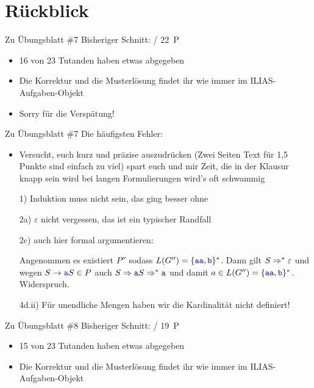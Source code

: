 
\newcommand{\handout}{}



\morescalingdelimiters



\section{Rückblick}

\begin{frame}{Zu Übungsblatt \#7}
	Bisheriger Schnitt:  / 22~P

	\begin{itemize}[<+->]
		\item 16 von 23 Tutanden haben etwas abgegeben
		\item Die Korrektur und die Musterlösung findet ihr wie immer im ILIAS-Aufgaben-Objekt
		\item Sorry für die Verspätung!
	\end{itemize}
\end{frame}

\begin{frame}{Zu Übungsblatt \#7}
	Die häufigsten Fehler:
	\begin{itemize}[<+->]
		\item Versucht, euch kurz und präzise auszudrücken \small{(Zwei Seiten Text für 1,5 Punkte sind einfach zu viel)}
		\implitem spart euch und mir Zeit, die in der Klausur knapp sein wird
		\implitem bei langen Formulierungen wird's oft schwammig
		\item[1)] Induktion muss nicht sein, das ging besser ohne
		\item[2a)] $\varepsilon$ nicht vergessen, das ist ein typischer Randfall
		\item[2c)] auch hier formal argumentieren:
		\item[] Angenommen es existiert $P''$ sodass $L(G'')=\{\hbox{\textcolor{blue}{\texttt{aa}}},\hbox{\textcolor{blue}{\texttt{b}}}\}^*$. Dann gilt $S \Rightarrow^* \varepsilon$ und wegen $S\rightarrow \hbox{\textcolor{blue}{\texttt{a}}}S \in P$ auch $S \Rightarrow \hbox{\textcolor{blue}{\texttt{a}}}S \Rightarrow^* \hbox{\textcolor{blue}{\texttt{a}}}$ und damit $a\in L(G'')=\{\hbox{\textcolor{blue}{\texttt{aa}}},\hbox{\textcolor{blue}{\texttt{b}}}\}^*$. Widerspruch.
		\item[4d.ii)] Für unendliche Mengen haben wir die Kardinalität nicht definiert! 
	\end{itemize}
\end{frame}

\begin{frame}{Zu Übungsblatt \#8}
	Bisheriger Schnitt:  / 19~P

	\begin{itemize}[<+->]
		\item 15 von 23 Tutanden haben etwas abgegeben
		\item Die Korrektur und die Musterlösung findet ihr wie immer im ILIAS-Aufgaben-Objekt
	\end{itemize}
\end{frame}

